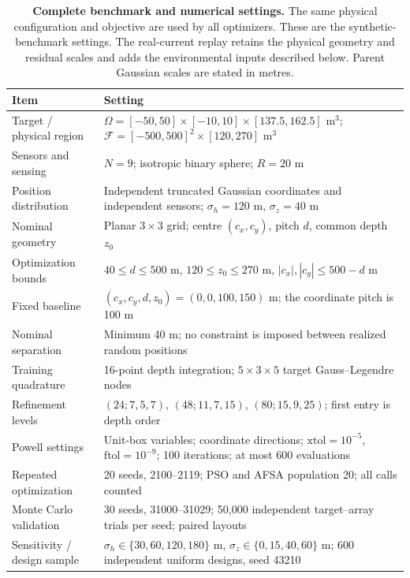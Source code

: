 \documentclass[fleqn,10pt]{wlscirep}
\begin{document}
\begin{table}[htbp]\centering\small
\caption{\textbf{Complete benchmark and numerical settings.} The same physical configuration and objective are used by all optimizers. These are the synthetic-benchmark settings. The real-current replay retains the physical geometry and residual scales and adds the environmental inputs described below. Parent Gaussian scales are stated in metres.}\label{tab:parameters}
\begin{tabular}{p{.29\linewidth}p{.64\linewidth}}\toprule
Item & Setting\\\midrule
Target / physical region & $\Omega=[-50,50]\times[-10,10]\times[137.5,162.5]$ m$^3$; $\mathcal F=[-500,500]^2\times[120,270]$ m$^3$\\
Sensors and sensing & $N=9$; isotropic binary sphere; $R=20$ m\\
Position distribution & Independent truncated Gaussian coordinates and independent sensors; $\sigma_h=120$ m, $\sigma_z=40$ m\\
Nominal geometry & Planar $3\times3$ grid; centre $(c_x,c_y)$, pitch $d$, common depth $z_0$\\
Optimization bounds & $40\le d\le500$ m, $120\le z_0\le270$ m, $|c_x|,|c_y|\le500-d$ m\\
Fixed baseline & $(c_x,c_y,d,z_0)=(0,0,100,150)$ m; the coordinate pitch is 100 m\\
Nominal separation & Minimum 40 m; no constraint is imposed between realized random positions\\
Training quadrature & 16-point depth integration; $5\times3\times5$ target Gauss--Legendre nodes\\
Refinement levels & $(24;7,5,7)$, $(48;11,7,15)$, $(80;15,9,25)$; first entry is depth order\\
Powell settings & Unit-box variables; coordinate directions; $\mathrm{xtol}=10^{-5}$, $\mathrm{ftol}=10^{-9}$; 100 iterations; at most 600 evaluations\\
Repeated optimization & 20 seeds, 2100--2119; PSO and AFSA population 20; all calls counted\\
Monte Carlo validation & 30 seeds, 31000--31029; 50,000 independent target--array trials per seed; paired layouts\\
Sensitivity / design sample & $\sigma_h\in\{30,60,120,180\}$ m, $\sigma_z\in\{0,15,40,60\}$ m; 600 independent uniform designs, seed 43210\\\bottomrule
\end{tabular}
\end{table}
\end{document}
